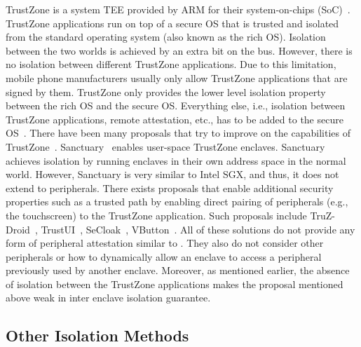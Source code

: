  TrustZone is a system TEE provided by ARM for their system-on-chips (SoC)~\cite{winter2008trusted}. TrustZone applications run on top of a secure OS that is trusted and isolated from the standard operating system (also known as the rich OS). Isolation between the two worlds is achieved by an extra bit on the bus. 
However, there is no isolation between different TrustZone applications. Due to this limitation, mobile phone manufacturers usually only allow TrustZone applications that are signed by them. %
TrustZone only provides the lower level isolation property between the rich OS and the secure OS. Everything else, i.e., isolation between TrustZone applications, remote attestation, etc., has to be added to the secure OS~\cite{ning2014samsungknox}. There have been many proposals that try to improve on the capabilities of TrustZone~\cite{brasser2019sanctuary,hua2017vtz}. Sanctuary~\cite{brasser2019sanctuary} enables user-space TrustZone enclaves. Sanctuary achieves isolation by running enclaves in their own address space in the normal world. However, Sanctuary is very similar to Intel SGX, and thus, it does not extend to peripherals.
There exists proposals that enable additional security properties such as a trusted path by enabling direct pairing of peripherals (e.g., the touchscreen) to the TrustZone application. Such proposals include TruZ-Droid~\cite{TruZ-Droid}, TrustUI~\cite{trustUI}, SeCloak~\cite{SeCloak}, VButton~\cite{VButton}. All of these solutions do not provide any form of peripheral attestation similar to \name{}. They also do not consider other peripherals or how to dynamically allow an enclave to access a peripheral previously used by another enclave. Moreover, as mentioned earlier, the absence of isolation between the TrustZone applications makes the proposal mentioned above weak in inter enclave isolation guarantee.

\subsection{Other Isolation Methods}

